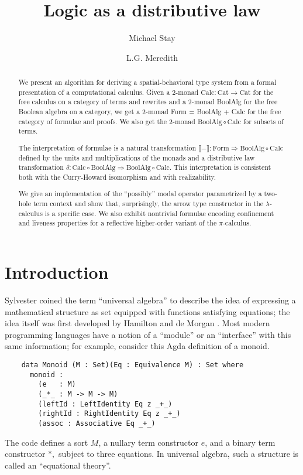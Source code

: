 \documentclass{llncs}
\title{Logic as a distributive law}
\author{
Michael Stay\inst{1}\\
\and
L.G. Meredith\inst{2}\\
}
\institute{
  {Pyrofex Corp.}\\
  \email{\fontsize{8}{8}\selectfont stay@pyrofex.net}\\
  \and
  {Synereo, Ltd}\\
  \email{\fontsize{8}{8}\selectfont greg@synereo.com}
}
\newcommand{\interp}[1]{\llbracket #1 \rrbracket}
\newcommand{\maps}{\colon}
\newcommand{\Cat}{\mathrm{Cat}}
\newcommand{\Calc}{\mathrm{Calc}}
\newcommand{\BoolAlg}{\mathrm{BoolAlg}}
\renewcommand{\Form}{\mathrm{Form}}
\begin{document}
\maketitle
\begin{abstract}
\noindent
  We present an algorithm for deriving a spatial-behavioral type system from a formal presentation of a computational calculus.  Given a 2-monad $\Calc\maps \Cat \to \Cat$ for the free calculus on a category of terms and rewrites and a 2-monad BoolAlg for the free Boolean algebra on a category, we get a 2-monad Form = BoolAlg + Calc for the free category of formulae and proofs.  We also get the 2-monad $\BoolAlg \circ \Calc$ for subsets of terms.

  The interpretation of formulae is a natural transformation $\interp{-} \maps \Form \Rightarrow \BoolAlg \circ \Calc$ defined by the units and multiplications of the monads and a distributive law transformation $\delta\maps \Calc \circ \BoolAlg \Rightarrow \BoolAlg \circ \Calc.$  This interpretation is consistent both with the Curry-Howard isomorphism and with realizability.

  We give an implementation of the ``possibly'' modal operator parametrized by a two-hole term context and show that, surprisingly, the arrow type constructor in the $\lambda$-calculus is a specific case.  We also exhibit nontrivial formulae encoding confinement and liveness properties for a reflective higher-order variant of the $\pi$-calculus.

\end{abstract}
\section{Introduction}
  
  Sylvester coined the term ``universal algebra'' to describe the idea of expressing a mathematical structure as set equipped with functions satisfying equations; the idea itself was first developed by Hamilton and de Morgan \cite{Graetzer}.  Most modern programming languages have a notion of a ``module'' or an ``interface'' with this same information; for example, consider this Agda definition of a monoid.
  \begin{verbatim}
    data Monoid (M : Set)(Eq : Equivalence M) : Set where
      monoid :
        (e   : M)
        (_*_ : M -> M -> M)
        (leftId : LeftIdentity Eq z _+_)
        (rightId : RightIdentity Eq z _+_)
        (assoc : Associative Eq _+_)
  \end{verbatim}
  The code defines a sort $M$, a nullary term constructor $e$, and a binary term constructor $*,$ subject to three equations. In universal algebra, such a structure is called an ``equational theory''.
\end{document}
